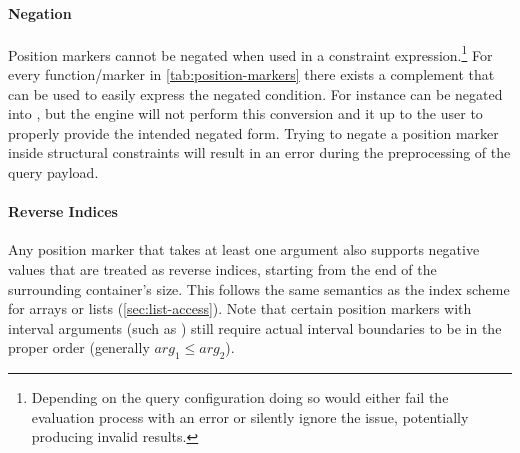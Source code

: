 \documentclass[11pt,a4paper]{article}
\begin{document}
\paragraph{Negation}
\noindent Position markers cannot be negated when used in a constraint expression.\footnote{Depending on the query configuration doing so would either fail the evaluation process with an error or silently ignore the issue, potentially producing invalid results.}
For every function/marker in \cref{tab:position-markers} there exists a complement that can be used to easily express the negated condition.
For instance  can be negated into , but the engine will not perform this conversion and it up to the user to properly provide the intended negated form.
Trying to negate a position marker inside structural constraints will result in an error during the preprocessing of the query payload.

\paragraph{Reverse Indices}
\noindent Any position marker that takes at least one argument also supports negative values that are treated as reverse indices, starting from the end of the surrounding container's size.
This follows the same semantics as the index scheme for arrays or lists (\ref{sec:list-access}).
Note that certain position markers with interval arguments (such as ) still require actual interval boundaries to be in the proper order (generally $arg_1 \leq arg_2$).
\end{document}
